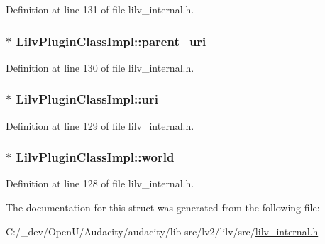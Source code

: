 Definition at line 131 of file lilv\+\_\+internal.\+h.

\subsubsection[{\texorpdfstring{parent\+\_\+uri}{parent_uri}}]{$\ast$ Lilv\+Plugin\+Class\+Impl\+::parent\+\_\+uri}\hypertarget{struct_lilv_plugin_class_impl_a612ae6206ff8bd62119351d0544795d8}{}\label{struct_lilv_plugin_class_impl_a612ae6206ff8bd62119351d0544795d8}


Definition at line 130 of file lilv\+\_\+internal.\+h.

\subsubsection[{\texorpdfstring{uri}{uri}}]{$\ast$ Lilv\+Plugin\+Class\+Impl\+::uri}\hypertarget{struct_lilv_plugin_class_impl_ac1c96a07b2e84e51725d4d9c91d64139}{}\label{struct_lilv_plugin_class_impl_ac1c96a07b2e84e51725d4d9c91d64139}


Definition at line 129 of file lilv\+\_\+internal.\+h.

\subsubsection[{\texorpdfstring{world}{world}}]{$\ast$ Lilv\+Plugin\+Class\+Impl\+::world}\hypertarget{struct_lilv_plugin_class_impl_aa08577f35010adbaaa893053cfe72dc9}{}\label{struct_lilv_plugin_class_impl_aa08577f35010adbaaa893053cfe72dc9}


Definition at line 128 of file lilv\+\_\+internal.\+h.



The documentation for this struct was generated from the following file\+:\begin{DoxyCompactItemize}
\item 
C\+:/\+\_\+dev/\+Open\+U/\+Audacity/audacity/lib-\/src/lv2/lilv/src/\hyperlink{lilv__internal_8h}{lilv\+\_\+internal.\+h}\end{DoxyCompactItemize}
